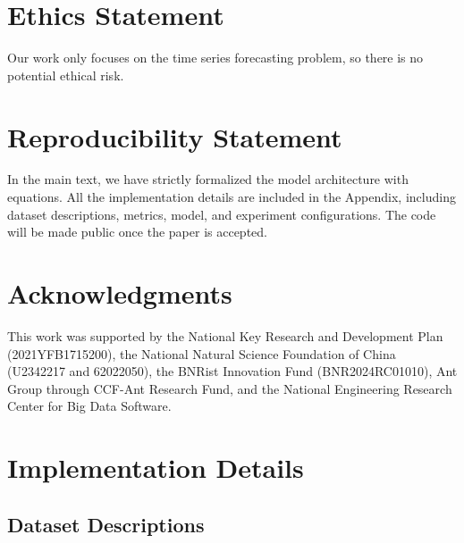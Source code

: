\documentclass{article} %
\begin{document}
\section{Ethics Statement}
Our work only focuses on the time series forecasting problem, so there is no potential ethical risk.

\section{Reproducibility Statement}
In the main text, we have strictly formalized the model architecture with equations. All the implementation details are included in the Appendix, including dataset descriptions, metrics, model, and experiment configurations. The code will be made public once the paper is accepted.

\section*{Acknowledgments}
This work was supported by the National Key Research and Development Plan (2021YFB1715200), the National Natural Science Foundation of China (U2342217 and 62022050), the BNRist Innovation Fund (BNR2024RC01010), Ant Group through CCF-Ant Research Fund, and the National Engineering Research Center for Big Data Software.




\vfill

\appendix

\clearpage

\section{Implementation Details} 

\subsection{Dataset Descriptions}\label{sec:dataset}
\end{document}
